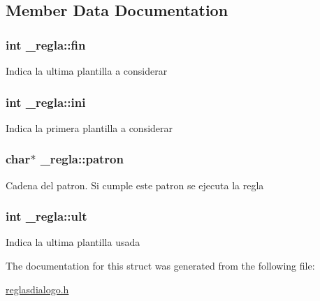 \subsection{Member Data Documentation}
\hypertarget{struct__regla_a047469b6b7102bdbc383db5192269bdd}{
\subsubsection[{fin}]{\setlength{\rightskip}{0pt plus 5cm}int {\bf \_\-regla::fin}}}
\label{struct__regla_a047469b6b7102bdbc383db5192269bdd}
Indica la ultima plantilla a considerar \hypertarget{struct__regla_aa7a3d16b7fd1b9f310e9d65d90c761ba}{
\subsubsection[{ini}]{\setlength{\rightskip}{0pt plus 5cm}int {\bf \_\-regla::ini}}}
\label{struct__regla_aa7a3d16b7fd1b9f310e9d65d90c761ba}
Indica la primera plantilla a considerar \hypertarget{struct__regla_a4fe5bb672ccf9cc7790a3a0a0e5aabe6}{
\subsubsection[{patron}]{\setlength{\rightskip}{0pt plus 5cm}char$\ast$ {\bf \_\-regla::patron}}}
\label{struct__regla_a4fe5bb672ccf9cc7790a3a0a0e5aabe6}
Cadena del patron. Si cumple este patron se ejecuta la regla \hypertarget{struct__regla_a5b2ecb01c9f5e03d33be5e330bcc16d3}{
\subsubsection[{ult}]{\setlength{\rightskip}{0pt plus 5cm}int {\bf \_\-regla::ult}}}
\label{struct__regla_a5b2ecb01c9f5e03d33be5e330bcc16d3}
Indica la ultima plantilla usada 

The documentation for this struct was generated from the following file:\begin{DoxyCompactItemize}
\item 
\hyperlink{reglasdialogo_8h}{reglasdialogo.h}\end{DoxyCompactItemize}
